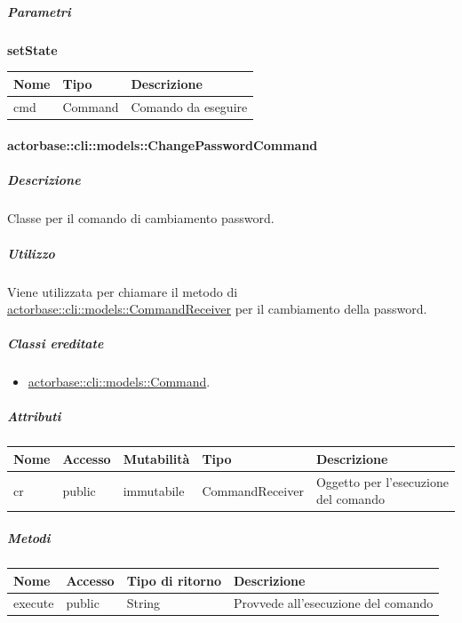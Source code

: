 \documentclass{scalatekids-article}
\begin{document}
\subparagraph{Parametri}

\begin{center}
  \textbf{setState}
\end{center}
\begin{tabular}{| p{3cm} | p{3.5cm} | p{8.5cm} |}
  \hline
  Nome & Tipo & Descrizione\\
  \hline
  cmd & Command & Comando da eseguire\\
  \hline
\end{tabular}

\paragraph{actorbase::cli::models::ChangePasswordCommand}
\label{sec:actorbase::cli::models::ChangePasswordCommand}

\subparagraph{Descrizione}

Classe per il comando di cambiamento password.

\subparagraph{Utilizzo}

Viene utilizzata per chiamare il metodo di
\hyperref[sec:actorbase::cli::models::CommandReceiver]{actorbase::cli::models::CommandReceiver} per il cambiamento della password.

\subparagraph{Classi ereditate}

\begin{itemize}
\item \hyperref[sec:actorbase::cli::models::Command]{actorbase::cli::models::Command}.
\end{itemize}

\subparagraph{Attributi}

\begin{tabular}{| p{1cm} | p{1.5cm} | p{2cm} | p{4cm} | p{8.5cm} |}
  \hline
  Nome & Accesso & Mutabilità & Tipo & Descrizione\\
  \hline
  cr & public & immutabile & CommandReceiver & Oggetto per l'esecuzione del comando\\
  \hline
\end{tabular}

\subparagraph{Metodi}

\begin{tabular}{| l | l | l | l |}
  \hline
  Nome & Accesso & Tipo di ritorno & Descrizione\\
  \hline
  execute & public & String & Provvede all'esecuzione del comando\\
  \hline
\end{tabular}
\end{document}
